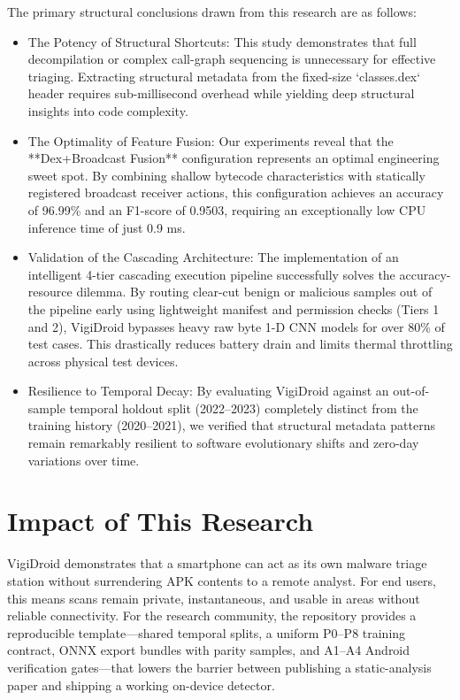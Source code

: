 The primary structural conclusions drawn from this research are as follows:
\begin{itemize}
   


 \item The Potency of Structural Shortcuts: This study demonstrates that full decompilation or complex call-graph sequencing is unnecessary for effective triaging. Extracting structural metadata from the fixed-size `classes.dex` header requires sub-millisecond overhead while yielding deep structural insights into code complexity.
 \item The Optimality of Feature Fusion: Our experiments reveal that the **Dex+Broadcast Fusion** configuration represents an optimal engineering sweet spot. By combining shallow bytecode characteristics with statically registered broadcast receiver actions, this configuration achieves an accuracy of 96.99\% and an F1-score of 0.9503, requiring an exceptionally low CPU inference time of just 0.9 ms.
 \item Validation of the Cascading Architecture: The implementation of an intelligent 4-tier cascading execution pipeline successfully solves the accuracy-resource dilemma. By routing clear-cut benign or malicious samples out of the pipeline early using lightweight manifest and permission checks (Tiers 1 and 2), VigiDroid bypasses heavy raw byte 1-D CNN models for over 80\% of test cases. This drastically reduces battery drain and limits thermal throttling across physical test devices.
 \item Resilience to Temporal Decay: By evaluating VigiDroid against an out-of-sample temporal holdout split (2022--2023) completely distinct from the training history (2020--2021), we verified that structural metadata patterns remain remarkably resilient to software evolutionary shifts and zero-day variations over time.
\end{itemize}

\section{Impact of This Research}
VigiDroid demonstrates that a smartphone can act as its own malware triage station without surrendering APK contents to a remote analyst. For end users, this means scans remain private, instantaneous, and usable in areas without reliable connectivity. For the research community, the repository provides a reproducible template---shared temporal splits, a uniform P0--P8 training contract, ONNX export bundles with parity samples, and A1--A4 Android verification gates---that lowers the barrier between publishing a static-analysis paper and shipping a working on-device detector.


